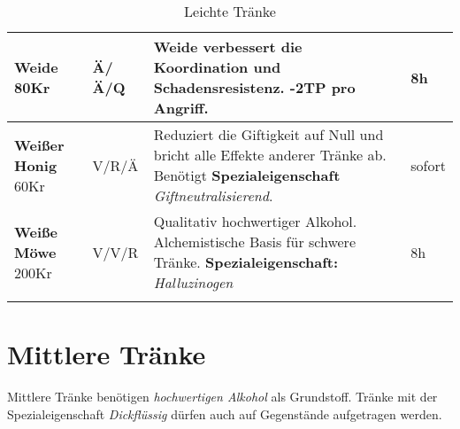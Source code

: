\begin{longtable}{|p{3cm}|p{}|p{8cm}|p{}|}
\textbf{Weide} \newline 80Kr & Ä/Ä/Q & Weide verbessert die Koordination und Schadensresistenz. -2TP pro Angriff. & 8h \\ \hline

\textbf{Weißer Honig} \newline 60Kr & V/R/Ä & Reduziert die Giftigkeit auf Null und bricht alle Effekte anderer Tränke ab. Benötigt \textbf{Spezialeigenschaft} \textit{Giftneutralisierend}. & sofort \\ \hline

\textbf{Weiße Möwe} \newline 200Kr & V/V/R & Qualitativ hochwertiger Alkohol. Alchemistische Basis für schwere Tränke. \textbf{Spezialeigenschaft:} \textit{Halluzinogen} & 8h \\ \hline

\caption{Leichte Tränke}
\label{tab:Leichte_traenke}
\end{longtable}

\section{Mittlere Tränke}
Mittlere Tränke benötigen \textit{hochwertigen Alkohol} als Grundstoff. Tränke mit der Spezialeigenschaft \textit{Dickflüssig} dürfen auch auf Gegenstände aufgetragen werden.

